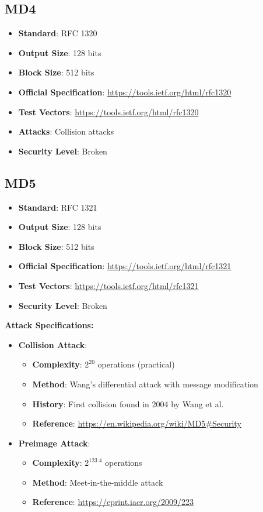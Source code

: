 \documentclass[11pt,a4paper]{article}
\begin{document}
\subsection{MD4}
\begin{itemize}
    \item \textbf{Standard}: RFC 1320
    \item \textbf{Output Size}: 128 bits
    \item \textbf{Block Size}: 512 bits
    \item \textbf{Official Specification}: \url{https://tools.ietf.org/html/rfc1320}
    \item \textbf{Test Vectors}: \url{https://tools.ietf.org/html/rfc1320}
    \item \textbf{Attacks}: Collision attacks
    \item \textbf{Security Level}: Broken
\end{itemize}

\subsection{MD5}
\begin{itemize}
    \item \textbf{Standard}: RFC 1321
    \item \textbf{Output Size}: 128 bits
    \item \textbf{Block Size}: 512 bits
    \item \textbf{Official Specification}: \url{https://tools.ietf.org/html/rfc1321}
    \item \textbf{Test Vectors}: \url{https://tools.ietf.org/html/rfc1321}
    \item \textbf{Security Level}: Broken
\end{itemize}

\textbf{Attack Specifications:}
\begin{itemize}
    \item \textbf{Collision Attack}: 
    \begin{itemize}
        \item \textbf{Complexity}: $2^{20}$ operations (practical)
        \item \textbf{Method}: Wang's differential attack with message modification
        \item \textbf{History}: First collision found in 2004 by Wang et al.
        \item \textbf{Reference}: \url{https://en.wikipedia.org/wiki/MD5#Security}
    \end{itemize}
    \item \textbf{Preimage Attack}: 
    \begin{itemize}
        \item \textbf{Complexity}: $2^{123.4}$ operations
        \item \textbf{Method}: Meet-in-the-middle attack
        \item \textbf{Reference}: \url{https://eprint.iacr.org/2009/223}
    \end{itemize}
\end{itemize}
\end{document}
